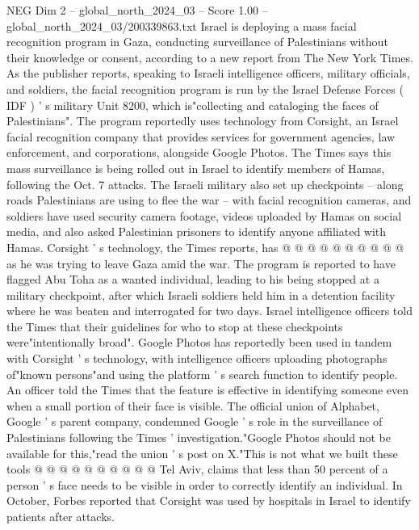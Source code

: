 \begin{textsample}{NEG Dim 2 – global\_north\_2024\_03 – Score 1.00 – global\_north\_2024\_03/200339863.txt}  \label{ex:f2_neg_078}
Israel is deploying a mass facial recognition program in Gaza, conducting surveillance of Palestinians without their knowledge or consent, according to a new report from The New York Times.
As the publisher reports, speaking to Israeli intelligence officers, military officials, and soldiers, the facial recognition program is run by the Israel Defense Forces ( IDF ) ' s military Unit 8200, which is"collecting and cataloging the faces of Palestinians".
The program reportedly uses technology from Corsight, an Israel facial recognition company that provides services for government agencies, law enforcement, and corporations, alongside Google Photos.
The Times says this mass surveillance is being rolled out in Israel to identify members of Hamas, following the Oct. 7 attacks.
The Israeli military also set up checkpoints -- along roads Palestinians are using to flee the war -- with facial recognition cameras, and soldiers have used security camera footage, videos uploaded by Hamas on social media, and also asked Palestinian prisoners to identify anyone affiliated with Hamas.
Corsight ' s technology, the Times reports, has @ @ @ @ @ @ @ @ @ @ as he was trying to leave Gaza amid the war.
The program is reported to have flagged Abu Toha as a wanted individual, leading to his being stopped at a military checkpoint, after which Israeli soldiers held him in a detention facility where he was beaten and interrogated for two days.
Israel intelligence officers told the Times that their guidelines for who to stop at these checkpoints were"intentionally broad".
Google Photos has reportedly been used in tandem with Corsight ' s technology, with intelligence officers uploading photographs of"known persons"and using the platform ' s search function to identify people.
An officer told the Times that the feature is effective in identifying someone even when a small portion of their face is visible.
The official union of Alphabet, Google ' s parent company, condemned Google ' s role in the surveillance of Palestinians following the Times ' investigation."Google Photos should not be available for this,"read the union ' s post on X."This is not what we built these tools @ @ @ @ @ @ @ @ @ @ Tel Aviv, claims that less than 50 percent of a person ' s face needs to be visible in order to correctly identify an individual.
In October, Forbes reported that Corsight was used by hospitals in Israel to identify patients after attacks.

\end{textsample}

